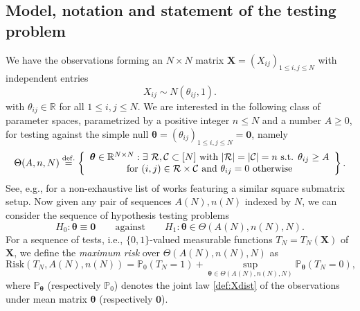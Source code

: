 \documentclass[11pt,reqno,letterpaper]{amsart}
\numberwithin{equation}{section}
\theoremstyle{plain}
\def \btheta{\boldsymbol{\theta}}
\def \bX{\mathbf{X}}
\def \P{\mathbb{P}}
\def \R{\mathbb{R}}
\def \cR {\mathcal{R}}
\def \cC {\mathcal{C}}
\begin{document}
\subsection{Model, notation and statement of the testing problem}\label{sec:stro}
We have the observations forming an $N \times N$ matrix $\bX=(X_{ij})_{1\le i, j \le N}$ with independent entries
\begin{equation}\label{def:Xdist}
  X_{ij}\sim N(\theta_{ij},1).  
\end{equation}
with $\theta_{ij} \in \R$ for all $1  \le i, j \le N$. We are interested in the following class of 
parameter spaces, parametrized by a positive integer $n\le N$ and a number $A \ge 0$, for testing against the simple null $\btheta = (\theta_{ij})_{1 \le i, j \le N} = \mathbf{0}$, namely
\begin{equation}\label{def:Theta}
\Theta(A,n, N) \stackrel{{\rm def.}}{=} \left\{
	\begin{array}{c}
    \btheta \in \R^{N \times N} : \exists\ \cR, \cC \subset[N] \mbox{ with }|\cR|= |\cC| = n \mbox{ s.t. } \theta_{ij}\ge A \\ \mbox{ for } (i, j) \in \cR\times\cC \mbox{ and } \theta_{ij} = 0 \mbox{ otherwise }
    \end{array}
	\right\}.
\end{equation}
See, e.g., \cite{MR3663635,ma2015computational,banks2018information,dadon2024detection,brennan2019universality,gamarnik2021overlap,oren2026inhomogeneous,hajek2018submatrix,kizildaug2025large} for a non-exhaustive list of works featuring a similar square submatrix setup. Now 
given any pair of sequences $A(N), n(N)$ indexed by $N$, we can consider the sequence of hypothesis testing problems
\begin{equation}\label{state:test_prob}
H_0:\btheta\equiv \mathbf 0
\qquad\mbox{against}\qquad
H_1:\btheta\in\Theta(A(N), n(N), N).
\end{equation}
For a sequence of tests, i.e., $\{0, 1\}$-valued measurable functions $T_{N} = T_{N}(\bX)$ 
of $\bX$, we define the {\em maximum risk} over $\Theta(A(N), n(N), N)$ as
\begin{equation}\label{eqn:bayes_risk}
\mathrm{Risk}(T_N, A(N), n(N))\stackrel{}{=}
\P_{0}(T_N = 1)+\sup_{\btheta\in\Theta(A(N), n(N), N)} \P_{\btheta}(T_N = 0),
\end{equation}
where $\P_{\btheta}$ (respectively $\P_0$) denotes the joint law \eqref{def:Xdist} of the 
observations under mean matrix $\btheta$ (respectively $\mathbf 0$).
\end{document}

